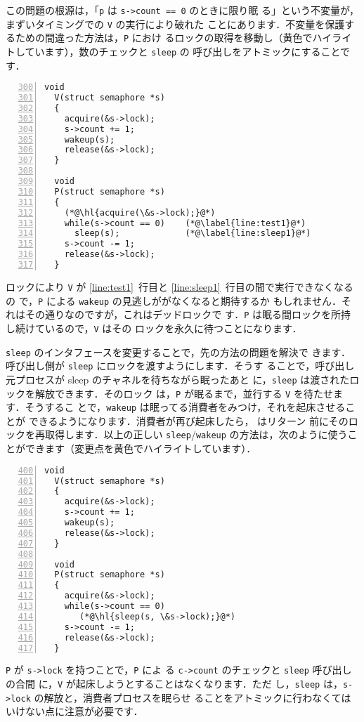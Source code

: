 この問題の根源は，「\lstinline{p} は \lstinline{s->count == 0} のときに限り眠
る」という不変量が，まずいタイミングでの \lstinline{V} の実行により破れた
ことにあります．不変量を保護するための間違った方法は，\lstinline{P} におけ
るロックの取得を移動し（黄色でハイライトしています），数のチェックと \lstinline{sleep} の
呼び出しをアトミックにすることです．
\begin{lstlisting}[numbers=left,firstnumber=300]
  void
  V(struct semaphore *s)
  {
    acquire(&s->lock);
    s->count += 1;
    wakeup(s);
    release(&s->lock);
  }
  
  void
  P(struct semaphore *s)
  {
    (*@\hl{acquire(\&s->lock);}@*)
    while(s->count == 0)    (*@\label{line:test1}@*)
      sleep(s);             (*@\label{line:sleep1}@*)
    s->count -= 1;
    release(&s->lock);
  }
\end{lstlisting}
ロックにより \lstinline{V} が \ref{line:test1}~行目と \ref{line:sleep1}~行目の間で実行できなくなるの
で，\lstinline{P} による \lstinline{wakeup} の見逃しががなくなると期待するか
もしれません．それはその通りなのですが，これはデッドロックで
す．\lstinline{P} は眠る間ロックを所持し続けているので，\lstinline{V} はその
ロックを永久に待つことになります．

\lstinline{sleep} のインタフェースを変更することで，先の方法の問題を解決で
きます．呼び出し側が \lstinline{sleep} にロックを渡すようにします．そうす
ることで，呼び出し元プロセスが sleep のチャネルを待ちながら眠ったあと
に，\lstinline{sleep} は渡されたロックを解放できます．そのロック
は，\lstinline{P} が眠るまで，並行する \lstinline{V} を待たせます．そうするこ
とで，\lstinline{wakeup} は眠ってる消費者をみつけ，それを起床させることが
できるようになります．消費者が再び起床したら， はリターン
前にそのロックを再取得します．以上の正しい \lstinline{sleep}/\lstinline{wakeup}
の方法は，次のように使うことができます（変更点を黄色でハイライトしています）．
%
\begin{lstlisting}[numbers=left,firstnumber=400]
  void
  V(struct semaphore *s)
  {
    acquire(&s->lock);
    s->count += 1;
    wakeup(s);
    release(&s->lock);
  }

  void
  P(struct semaphore *s)
  {
    acquire(&s->lock);
    while(s->count == 0)
       (*@\hl{sleep(s, \&s->lock);}@*)
    s->count -= 1;
    release(&s->lock);
  }
\end{lstlisting}

\lstinline{P} が \lstinline{s->lock} を持つことで，\lstinline{P} によ
る \lstinline{c->count} のチェックと \lstinline{sleep} 呼び出しの合間
に，\lstinline{V} が起床しようとすることはなくなります．ただ
し，\lstinline{sleep} は，\lstinline{s->lock} の解放と，消費者プロセスを眠らせ
ることをアトミックに行わなくてはいけない点に注意が必要です．

